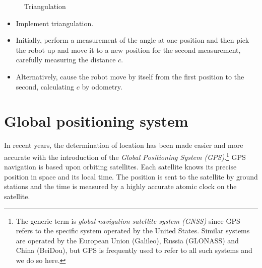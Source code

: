 \begin{figure}
\begin{center}
\caption{Triangulation}\label{fig.triangulation}
\end{center}
\end{figure}


\begin{framed}
\begin{itemize}
\item Implement triangulation.
\item Initially, perform a measurement of the angle at one position and then pick the robot up and move it to a new position for the second measurement, carefully measuring the distance $c$.
\item Alternatively, cause the robot move by itself from the first position to the second, calculating $c$ by odometry.
\end{itemize}
\end{framed}

\section{Global positioning system}\label{s.gps}

In recent years, the determination of location has been made easier and more accurate with the introduction of the \emph{Global Positioning System (GPS)}.\footnote{The generic term is \emph{global navigation satellite system (GNSS)} since GPS refers to the specific system operated by the United States. Similar systems are operated by the European Union (Galileo), Russia (GLONASS) and China (BeiDou), but GPS is frequently used to refer to all such systems and we do so here.} GPS navigation is based upon orbiting satellites. Each satellite knows its precise position in space and its local time. The position is sent to the satellite by ground stations and the time is measured by a highly accurate atomic clock on the satellite.

